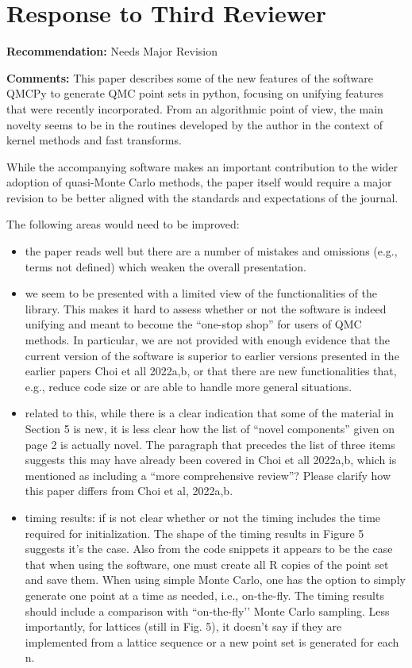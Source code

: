 \documentclass{article}
\newcommand{\rbullet}{\textcolor{red}{\textbullet}}
\begin{document}
\section{Response to Third Reviewer} 

\textbf{Recommendation:} Needs Major Revision

\noindent\textbf{Comments:} This paper describes some of the new features of the software QMCPy to generate QMC point sets in python, focusing on unifying features that were recently incorporated. From an algorithmic point of view, the main novelty seems to be in the routines developed by the author in the context of kernel methods and fast transforms.

While the accompanying software makes an important contribution to the wider adoption of quasi-Monte Carlo methods, the paper itself would require a major revision to be better aligned with the standards and expectations of the journal.

The following areas would need to be improved:
\begin{itemize}
    \item the paper reads well but there are a number of mistakes and omissions (e.g., terms not defined) which weaken the overall presentation.
    \item[\rbullet] we seem to be presented with a limited view of the functionalities of the library. This makes it hard to assess whether or not the software is indeed unifying and meant to become the “one-stop shop” for users of QMC methods. In particular, we are not provided with enough evidence that the current version of the software is superior to earlier versions presented in the earlier papers Choi et all 2022a,b, or that there are new functionalities that, e.g., reduce code size or are able to handle more general situations.
    \item[\rbullet] related to this, while there is a clear indication that some of the material in Section 5 is new, it is less clear how the list of “novel components” given on page 2 is actually novel. The paragraph that precedes the list of three items suggests this may have already been covered in Choi et all 2022a,b, which is mentioned as including a “more comprehensive review”? Please clarify how this paper differs from Choi et al, 2022a,b.
    \item[\rbullet] timing results: if is not clear whether or not the timing includes the time required for initialization. The shape of the timing results in Figure 5 suggests it’s the case. Also from the code snippets it appears to be the case that when using the software, one must create all R copies of the point set and save them. When using simple Monte Carlo, one has the option to simply generate one point at a time as needed, i.e., on-the-fly. The timing results should include a comparison with ``on-the-fly’’ Monte Carlo sampling. Less importantly, for lattices (still in Fig. 5), it doesn’t say if they are implemented from a lattice sequence or a new point set is generated for each n.
\end{itemize}
\end{document}
